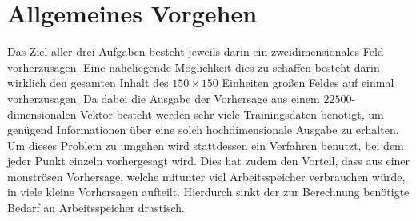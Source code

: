 \section{Allgemeines Vorgehen}
\label{sc:experiments_general}
Das Ziel aller drei Aufgaben besteht jeweils darin ein zweidimensionales Feld vorherzusagen. Eine naheliegende Möglichkeit dies zu schaffen besteht darin wirklich den gesamten Inhalt des $150 \times 150$ Einheiten großen Feldes auf einmal vorherzusagen. Da dabei die Ausgabe der Vorhersage aus einem $22500$-dimensionalen Vektor besteht werden sehr viele Trainingsdaten benötigt, um genügend Informationen über eine solch hochdimensionale Ausgabe zu erhalten. Um dieses Problem zu umgehen wird stattdessen ein Verfahren benutzt, bei dem jeder Punkt einzeln vorhergesagt wird. Dies hat zudem den Vorteil, dass aus einer monströsen Vorhersage, welche mitunter viel Arbeitsspeicher verbrauchen würde, in viele kleine Vorhersagen aufteilt. Hierdurch sinkt der zur Berechnung benötigte Bedarf an Arbeitsspeicher drastisch.\\

